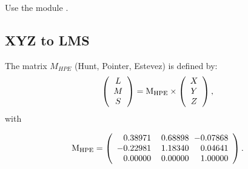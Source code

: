 \begin{pcomment}
\begin{premark}
Use the module .
\end{premark}
\end{pcomment}

% 

\subsection{XYZ to LMS}
The matrix $M_{HPE}$ (Hunt, Pointer, Estevez) is defined by:
\begin{eqnarray}
 \left(
\begin{array}{c}
L\\
M\\
S
\end{array}
\right)=
\rm{M}_{\rm HPE}\times
\left(
\begin{array}{c}
X\\
Y\\
Z
\end{array}
\right),
\end{eqnarray}
with

\begin{eqnarray}
\rm{M}_{\rm HPE}=\left( \begin{array}{r@{\hskip 12pt}r@{\hskip 6pt}r}
                     0.38971  & 0.68898 & -0.07868\\
                    -0.22981  & 1.18340 &  0.04641 \\
                     0.00000  & 0.00000 &  1.00000
                    \end{array}
\right).
\end{eqnarray}

